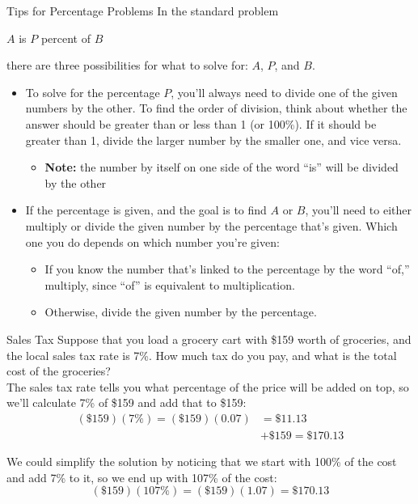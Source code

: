 \begin{proc}{Tips for Percentage Problems}
In the standard problem
\begin{center}
$A$ is $P$ percent of $B$
\end{center}
there are three possibilities for what to solve for: $A$, $P$, and $B$.
\begin{itemize}
\item To solve for the percentage $P$, you'll always need to divide one of the given numbers by the other.  To find the order of division, think about whether the answer should be greater than or less than 1 (or 100\%).  If it should be greater than 1, divide the larger number by the smaller one, and vice versa.
\begin{itemize}
\item \textbf{Note:} the number by itself on one side of the word ``is'' will be divided by the other
\end{itemize}
\item If the percentage is given, and the goal is to find $A$ or $B$, you'll need to either multiply or divide the given number by the percentage that's given.  Which one you do depends on which number you're given:
\begin{itemize}
\item If you know the number that's linked to the percentage by the word ``of,'' multiply, since ``of'' is equivalent to multiplication.
\item Otherwise, divide the given number by the percentage.
\end{itemize}
\end{itemize}
\end{proc}
\vfill

\begin{example}[https://www.youtube.com/watch?v=yCQCFHGGHms&list=PLfmpjsIzhztsZtnb7HnXrQ8SLoiOCIcAM&index=6]{Sales Tax}
Suppose that you load a grocery cart with \$159 worth of groceries, and the local sales tax rate is 7\%. How much tax do you pay, and what is the total cost of the groceries?\\

\sol
The sales tax rate tells you what percentage of the price will be added on top, so we'll calculate 7\% of \$159 and add that to \$159:
\begin{align*}
(\$159)(7\%) = (\$159)(0.07) &= \$11.13\\
&+ \$159 = \boxed{\$170.13}
\end{align*}

We could simplify the solution by noticing that we start with 100\% of the cost and add 7\% to it, so we end up with 107\% of the cost: \[(\$159)(107\%) = (\$159)(1.07) = \$170.13\]
\end{example}
\vfill

